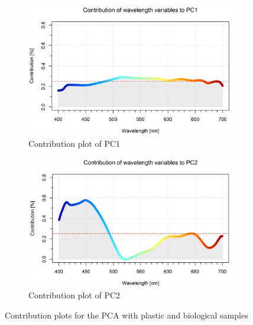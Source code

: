 \begin{figure}[H]
\centering
\begin{subfigure}{.5\textwidth}
  \centering
  \includegraphics[width=\textwidth]{Images/results/PCA_plastics_and_biology_cont_pc1.png}
  \caption{Contribution plot of PC1}
  \label{fig:PCA_plastics_and_biology_cont_pc1}
\end{subfigure}%
\begin{subfigure}{.5\textwidth}
  \centering
  \includegraphics[width=\textwidth]{Images/results/PCA_plastics_and_biology_cont_pc2.png}
  \caption{Contribution plot of PC2}
  \label{fig:PCA_plastics_and_biology_cont_pc2}
\end{subfigure}
\caption{Contribution plots for the PCA with plastic and biological samples}
\label{fig:PCA_and_bio_cont_plots}
\end{figure}

